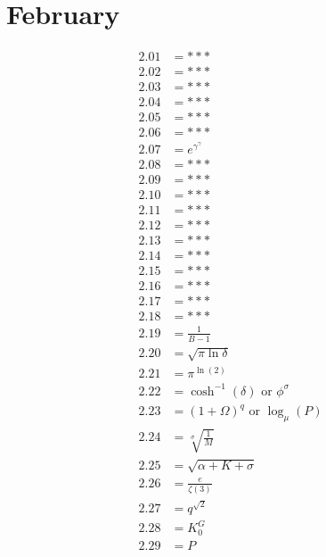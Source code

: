 \documentclass[12pt]{article}
\newcommand{\oder}{\text{ or }}
\begin{document}
\pagebreak

\section{February}
\begin{align*}
2.01 &= ***\\
2.02 &= ***\\
2.03 &= ***\\
2.04 &= ***\\
2.05 &= ***\\
2.06 &= ***\\
2.07 &= e^{\gamma^{\gamma}}\\
2.08 &= ***\\
2.09 &= ***\\
2.10 &= ***\\
2.11 &= ***\\
2.12 &= ***\\
2.13 &= ***\\
2.14 &= ***\\
2.15 &= ***\\
2.16 &= ***\\
2.17 &= ***\\
2.18 &= ***\\
2.19 &= \frac{1}{B-1}\\
2.20 &= \sqrt{\pi \ln{\delta}}\\
2.21 &= \pi^{\ln(2)}\\
2.22 &= \cosh^{-1}\left(\delta\right) \oder \phi^{\sigma}\\
2.23 &= \left(1+\Omega\right)^{q} \oder \log_{\mu}\left(P\right)\\
2.24 &= \sqrt[\sigma]{\frac{1}{M}}\\
2.25 &= \sqrt{\alpha+K+\sigma}\\
2.26 &= \frac{e}{\zeta(3)}\\
2.27 &= q^{\sqrt{2}}\\
2.28 &= K_{0}^{G}\\
2.29 &= P\\
\end{align*}

\pagebreak
\end{document}
